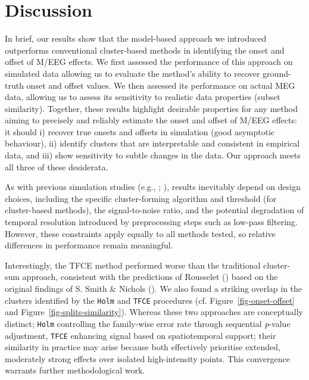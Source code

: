 \documentclass[
  doc,
  floatsintext,
  longtable,
  a4paper,
  nolmodern,
  notxfonts,
  notimes,
  colorlinks=true,linkcolor=blue,citecolor=blue,urlcolor=blue]{apa7}
\begin{document}
\section{Discussion}\label{discussion}

In brief, our results show that the model-based approach we introduced
outperforms conventional cluster-based methods in identifying the onset
and offset of M/EEG effects. We first assessed the performance of this
approach on simulated data allowing us to evaluate the method's ability
to recover ground-truth onset and offset values. We then assessed its
performance on actual MEG data, allowing us to assess its sensitivity to
realistic data properties (subset similarity). Together, these results
highlight desirable properties for any method aiming to precisely and
reliably estimate the onset and offset of M/EEG effects: it should i)
recover true onsets and offsets in simulation (good asymptotic
behaviour), ii) identify clusters that are interpretable and consistent
in empirical data, and iii) show sensitivity to subtle changes in the
data. Our approach meets all three of these desiderata.

As with previous simulation studies (e.g.,
;
), results
inevitably depend on design choices, including the specific
cluster-forming algorithm and threshold (for cluster-based methods), the
signal-to-noise ratio, and the potential degradation of temporal
resolution introduced by preprocessing steps such as low-pass filtering.
However, these constraints apply equally to all methods tested, so
relative differences in performance remain meaningful.

Interestingly, the TFCE method performed worse than the traditional
cluster-sum approach, consistent with the predictions of Rousselet
() based on the original
findings of S. Smith \& Nichols (). We
also found a striking overlap in the clusters identified by the
\texttt{Holm} and \texttt{TFCE} procedures (cf.
Figure~\ref{fig-onset-offset} and Figure~\ref{fig-splits-similarity}).
Whereas these two approaches are conceptually distinct; \texttt{Holm}
controlling the family-wise error rate through sequential \emph{p}-value
adjustment, \texttt{TFCE} enhancing signal based on spatiotemporal
support; their similarity in practice may arise because both effectively
prioritise extended, moderately strong effects over isolated
high-intensity points. This convergence warrants further methodological
work.
\end{document}
